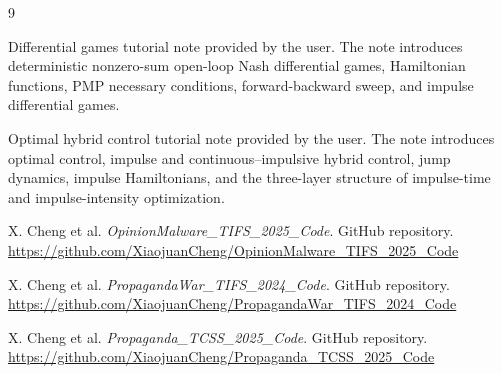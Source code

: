 \documentclass[11pt,a4paper]{article}
\begin{document}
\begin{thebibliography}{9}

Differential games tutorial note provided by the user. The note introduces deterministic nonzero-sum open-loop Nash differential games, Hamiltonian functions, PMP necessary conditions, forward-backward sweep, and impulse differential games.

Optimal hybrid control tutorial note provided by the user. The note introduces optimal control, impulse and continuous--impulsive hybrid control, jump dynamics, impulse Hamiltonians, and the three-layer structure of impulse-time and impulse-intensity optimization.

X. Cheng et al. \emph{OpinionMalware\_TIFS\_2025\_Code}. GitHub repository.\newline
\url{https://github.com/XiaojuanCheng/OpinionMalware_TIFS_2025_Code}

X. Cheng et al. \emph{PropagandaWar\_TIFS\_2024\_Code}. GitHub repository.\newline
\url{https://github.com/XiaojuanCheng/PropagandaWar_TIFS_2024_Code}

X. Cheng et al. \emph{Propaganda\_TCSS\_2025\_Code}. GitHub repository.\newline
\url{https://github.com/XiaojuanCheng/Propaganda_TCSS_2025_Code}

\end{thebibliography}
\end{document}
